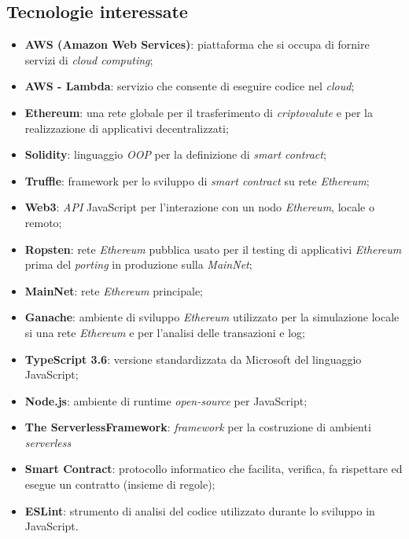 \subsection{Tecnologie interessate}
\begin{itemize}
	\item \textbf{AWS (Amazon Web Services)}: piattaforma che si occupa di fornire servizi di \textit{cloud computing\glos};
	\item \textbf{AWS - Lambda}: servizio che consente di eseguire codice nel \textit{cloud\glos};
	\item \textbf{Ethereum\glos}: una rete globale per il trasferimento di \textit{criptovalute\glo} e per la realizzazione di applicativi decentralizzati;
	\item \textbf{Solidity}: linguaggio \textit{OOP\glo} per la definizione di \textit{smart contract\glos};
	\item \textbf{Truffle}: framework per lo sviluppo di \textit{smart contract\glo} su rete \textit{Ethereum\glos};
	\item \textbf{Web3}: \textit{API\glo} JavaScript per l'interazione con un nodo \textit{Ethereum\glos}, locale o remoto;
	\item \textbf{Ropsten}: rete \textit{Ethereum\glo} pubblica usato per il testing di applicativi \textit{Ethereum\glo} prima del \textit{porting\glo} in produzione sulla \textit{MainNet\glos};
	\item \textbf{MainNet\glos}: rete \textit{Ethereum\glo} principale;
	\item \textbf{Ganache}: ambiente di sviluppo \textit{Ethereum\glo} utilizzato per la simulazione locale si una rete \textit{Ethereum\glo} e per l'analisi delle transazioni e log;
	\item \textbf{TypeScript 3.6}: versione standardizzata da Microsoft del linguaggio JavaScript;
	\item \textbf{Node.js}: ambiente di runtime \textit{open-source\glo} per JavaScript;
	\item \textbf{The Serverless\glo Framework\glos}: \textit{framework\glo} per la costruzione di ambienti \textit{serverless\glo}
	\item \textbf{Smart Contract\glos}: protocollo informatico che facilita, verifica, fa rispettare ed esegue un contratto (insieme di regole);
	\item \textbf{ESLint}: strumento di analisi del codice utilizzato durante lo sviluppo in JavaScript.
\end{itemize}

